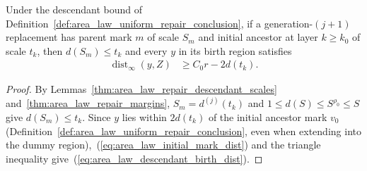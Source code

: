 \begin{lemma}
    \label{thm:area_law_descendant_birth_endpoint_distance}
    \leanok
    Under the descendant bound of Definition~\ref{def:area_law_uniform_repair_conclusion},
    if a generation-$(j+1)$ replacement has parent mark $m$ of scale $S_m$ and
    initial ancestor at layer $k\ge k_0$ of scale $t_k$, then $d(S_m)\le t_k$
    and every $y$ in its birth region satisfies
    \begin{align}
        \operatorname{dist}_\infty(y,Z) & \ge C_0r-2d(t_k).
        \label{eq:area_law_descendant_birth_dist}
    \end{align}
\end{lemma}
\begin{proof}\leanok
    By Lemmas~\ref{thm:area_law_repair_descendant_scales}
    and~\ref{thm:area_law_repair_margins}, $S_m=d^{(j)}(t_k)$ and
    $1\le d(S)\le S^{\rho_0}\le S$ give $d(S_m)\le t_k$. Since $y$ lies within
    $2d(t_k)$ of the initial ancestor mark $v_0$
    (Definition~\ref{def:area_law_uniform_repair_conclusion}, even when
    extending into the dummy region),~(\ref{eq:area_law_initial_mark_dist}) and
    the triangle inequality give~(\ref{eq:area_law_descendant_birth_dist}).
\end{proof}

